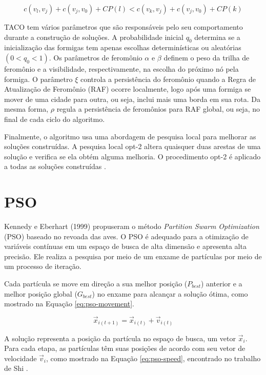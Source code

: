 \begin{equation} \label{eq:taco-custo-parcial} 
    c(v_l, v_j) + c(v_j , v_0) + CP(l) < c(v_k, v_j) + c(v_j , v_0) + CP(k)
\end{equation}

TACO tem vários parâmetros que são responsáveis pelo seu comportamento durante a construção de soluções. A probabilidade inicial $q_0$ determina se a inicialização das formigas tem apenas escolhas determinísticas ou aleatórias $(0 < q_0 <1)$. Os parâmetros de feromônio $\alpha$ e $\beta$ definem o peso da trilha de feromônio e a visibilidade, respectivamente, na escolha do próximo nó pela formiga. O parâmetro $\xi$ controla a persistência do feromônio quando a Regra de Atualização de Feromônio (RAF) ocorre localmente, logo após uma formiga se mover de uma cidade para outra, ou seja, inclui mais uma borda em sua rota. Da mesma forma, $\rho$ regula a persistência de feromônios para RAF global, ou seja, no final de cada ciclo do algoritmo.

Finalmente, o algoritmo usa uma abordagem de pesquisa local para melhorar as soluções construídas. A pesquisa local opt-2 altera quaisquer duas arestas de uma solução e verifica se ela obtém alguma melhoria. O procedimento opt-2 é aplicado a todas as soluções construídas \cite{vallivaara2008team}.

\section{PSO}
\label{sec-pso}

Kennedy e Eberhart (1999) \cite{kennedy1999particle} propuseram o método \textit{Partition Swarm Optimization} (PSO) baseado no revoada das aves. O PSO é adequado para a otimização de variáveis contínuas em um espaço de busca de alta dimensão e apresenta alta precisão. Ele realiza a pesquisa por meio de um enxame de partículas por meio de um processo de iteração.

Cada partícula se move em direção a sua melhor posição ($P_{best}$) anterior e a melhor posição global ($G_{best}$) no enxame para alcançar a solução ótima, como mostrado na Equação \ref{eq:pso-movement}.

\begin{equation} \label{eq:pso-movement}
    \vec{x}_{i(t+1)} = \vec{x}_{i(t)} + \vec{v}_{i(t)}
\end{equation}

A solução representa a posição da partícula no espaço de busca, um vetor $\vec{x}_i$. Para cada etapa, as partículas têm suas posições de acordo com seu vetor de velocidade $\vec{v}_i$, como mostrado na Equação \ref{eq:pso-speed}, encontrado no trabalho de Shi \cite{shi1998modified}.

